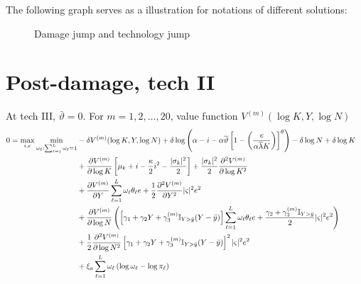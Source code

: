 \documentclass[11pt]{article}
\begin{document}
	The following graph serves as a illustration for notations of different solutions:
	\begin{figure}[H]
		\centering
		\caption{Damage jump and technology jump}
	\end{figure}

	\section{Post-damage, tech II}
	
	At tech III, $\bar\vartheta = 0$.
	For $m = 1,2,\dots, 20$, value function $V^{(m)} (\log K, Y, \log N)$
	\begin{align*} 
		0 = \max_{i,e} \min_{\omega_\ell:\sum_{\ell = 1}^L \omega_\ell = 1 } &   - \delta V^{(m)}(\log K,Y, \log N) +  \delta \log \left( \alpha - i -  \alpha \overline{\vartheta} \left[ 1 - \left(\frac {e} { \alpha \overline\lambda K} \right) \right]^\theta \right) - \delta \log N + \delta\log K \cr 
		& + \frac {\partial V^{(m)}}{\partial \log K} 
		\left[ \mu_k    + i   -
		{\frac { \kappa} 2} i^2  -  \frac  {|\sigma_k|^2}  2\right]  + \frac {|\sigma_k|^2} 2  \frac {\partial^2 V^{(m)}}{\partial \log K^2} \cr
		& + \frac {\partial  V^{(m)}}{\partial Y}  \sum_{\ell=1}^L \omega_\ell  \theta_\ell {e} + {\frac 1 2} \frac {\partial^2 V^{(m)}}{\partial Y^2} |\varsigma|^2 e^2  \cr
		& + \frac{\partial V^{(m)}}{\partial \log N} \left( \left[ \gamma_1 + \gamma_2 Y + \gamma_3^{(m)} \mathbb{I}_{Y > \bar{y}} (Y - \bar{y})\right]   \sum_{\ell=1}^L \omega_\ell \theta_\ell {e} + \frac{\gamma_2 + \gamma_3^{(m)}\mathbb{I}_{Y>\bar{y}}}{2} |\varsigma|^2  e^2 \right) \cr
		& + \frac{1}{2}\frac{\partial^2 V^{(m)}}{\partial \log N^2} \left[ \gamma_1 + \gamma_2 Y + \gamma_3^{(m)}\mathbb{I}_{Y > \bar{y}} (Y - \bar{y})\right]^2 |\varsigma|^2 e^2 \cr
		& + \xi_a \sum_{\ell = 1}^L \omega_\ell \left( \log \omega_\ell - \log \pi_\ell \right)
	\end{align*} 
	
\end{document}
